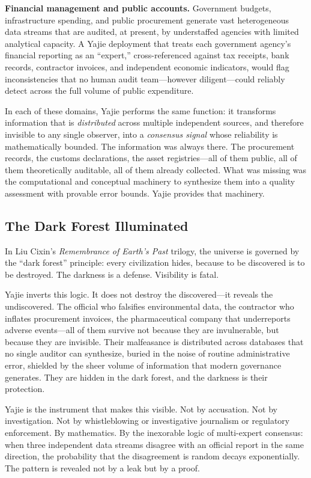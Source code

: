 \documentclass[12pt,a4paper]{ctexart}
\theoremstyle{definition}
\theoremstyle{remark}
\begin{document}
\textbf{Financial management and public accounts.} Government budgets, infrastructure spending, and public procurement generate vast heterogeneous data streams that are audited, at present, by understaffed agencies with limited analytical capacity. A Yajie deployment that treats each government agency's financial reporting as an ``expert,'' cross-referenced against tax receipts, bank records, contractor invoices, and independent economic indicators, would flag inconsistencies that no human audit team—however diligent—could reliably detect across the full volume of public expenditure.

In each of these domains, Yajie performs the same function: it transforms information that is \textit{distributed} across multiple independent sources, and therefore invisible to any single observer, into a \textit{consensus signal} whose reliability is mathematically bounded. The information was always there. The procurement records, the customs declarations, the asset registries—all of them public, all of them theoretically auditable, all of them already collected. What was missing was the computational and conceptual machinery to synthesize them into a quality assessment with provable error bounds. Yajie provides that machinery.

\subsection{The Dark Forest Illuminated}

In Liu Cixin's \textit{Remembrance of Earth's Past} trilogy, the universe is governed by the ``dark forest'' principle: every civilization hides, because to be discovered is to be destroyed. The darkness is a defense. Visibility is fatal.

Yajie inverts this logic. It does not destroy the discovered—it reveals the undiscovered. The official who falsifies environmental data, the contractor who inflates procurement invoices, the pharmaceutical company that underreports adverse events—all of them survive not because they are invulnerable, but because they are invisible. Their malfeasance is distributed across databases that no single auditor can synthesize, buried in the noise of routine administrative error, shielded by the sheer volume of information that modern governance generates. They are hidden in the dark forest, and the darkness is their protection.

Yajie is the instrument that makes this visible. Not by accusation. Not by investigation. Not by whistleblowing or investigative journalism or regulatory enforcement. By mathematics. By the inexorable logic of multi-expert consensus: when three independent data streams disagree with an official report in the same direction, the probability that the disagreement is random decays exponentially. The pattern is revealed not by a leak but by a proof.
\end{document}
